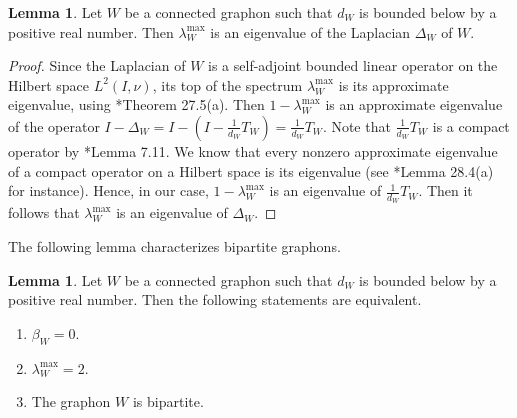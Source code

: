 \documentclass[12pt,a4paper,bold]{thesis}
\theoremstyle{definition}
\newtheorem{lemma}[thm]{Lemma}
\begin{document}
\begin{lemma} \label{lemma:actualEigenVal}
    Let $W$ be a connected graphon such that $d_W$ is bounded below by a positive real number.
    Then $\lambda_W^{\max}$ is an eigenvalue of the Laplacian $\Delta_W$ of $W$.
\end{lemma}

\begin{proof}
    Since the Laplacian of $W$ is a self-adjoint bounded linear operator on the Hilbert space 
    $L^2(I,\nu)$, its top of the spectrum $\lambda_W^{\max}$ is its approximate eigenvalue,
    using \cite{BVLimaye-FA96}*{Theorem 27.5(a)}. Then $1 - \lambda_W^{\max}$ 
    is an approximate eigenvalue of the operator 
    $I - \Delta_W = I - \left(I - \frac{1}{d_W} T_W\right) 
    = \frac{1}{d_W} T_W$. Note that $\frac{1}{d_W} T_W$ is a compact operator 
    by \cite{Abhishek-Mahan24}*{Lemma 7.11}. We know that every nonzero approximate eigenvalue 
    of a compact operator on a Hilbert space is its eigenvalue 
    (see \cite{BVLimaye-FA96}*{Lemma 28.4(a)} for instance). 
    Hence, in our case, $1 - \lambda_W^{\max}$ is an eigenvalue of $\frac{1}{d_W} T_W$.
    Then it follows that $\lambda_W^{\max}$ is an eigenvalue of $\Delta_W$.
\end{proof}

The following lemma characterizes bipartite graphons.

\begin{lemma} \label{lemma:bipartiteGraphonChar}
    Let $W$ be a connected graphon such that $d_W$ is bounded below by a positive real number.
    Then the following statements are equivalent.
    \begin{enumerate}
        \item $\beta_W = 0$.
        \item $\lambda_W^{\max} = 2$.
        \item The graphon $W$ is bipartite.
    \end{enumerate}
\end{lemma}
\end{document}
